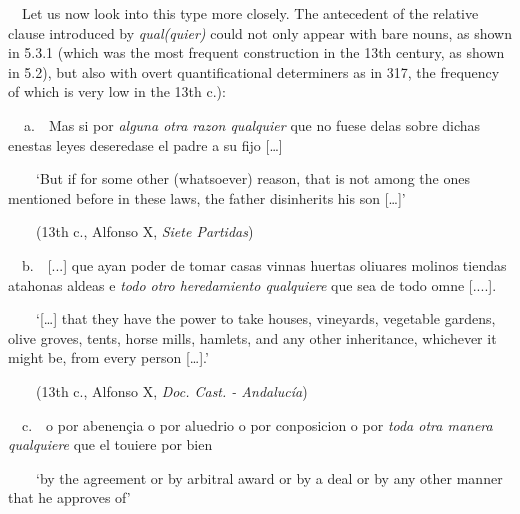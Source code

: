 \begin{styleStandard}
\ \ Let us now look into this type more closely. The antecedent of the relative clause introduced by \textit{qual(quier) }could not only appear with bare nouns, as shown in 5.3.1 (which was the most frequent construction in the 13th century, as shown in 5.2), but also with overt quantificational determiners as in 317, the frequency of which is very low in the 13th c.):
\end{styleStandard}

\begin{styleStandard}
\textbf{\ \ }a.\ \ Mas si por \textit{alguna otra razon qualquier} que no fuese delas sobre dichas enestas leyes deseredase el padre a su fijo […]
\end{styleStandard}

\begin{styleStandard}
\ \ \ \ ‘But if for some other (whatsoever) reason, that is not among the ones mentioned before in these laws, the father disinherits his son […]’
\end{styleStandard}

\begin{styleStandard}
\ \ \ \ (13th c., Alfonso X, \textit{Siete Partidas})
\end{styleStandard}

\begin{styleStandard}
\ \ b.\ \ [...] que ayan poder de tomar casas vinnas huertas oliuares molinos tiendas atahonas aldeas e \textit{todo otro heredamiento qualquiere} que sea de todo omne [....]. 
\end{styleStandard}

\begin{styleStandard}
\ \ \ \ ‘[…] that they have the power to take houses, vineyards, vegetable gardens, olive groves, tents, horse mills, hamlets, and any other inheritance, whichever it might be, from every person […].’
\end{styleStandard}

\begin{styleStandard}
\ \ \ \ (13th c., Alfonso X,\textit{ Doc. Cast. - Andalucía})
\end{styleStandard}

\begin{styleStandard}
\ \ c.\ \ o por abenençia o por aluedrio o por conposicion o por \textit{toda otra manera qualquiere} que el touiere por bien 
\end{styleStandard}

\begin{styleStandard}
\ \ \ \ ‘by the agreement or by arbitral award or by a deal or by any other manner that he approves of’
\end{styleStandard}


